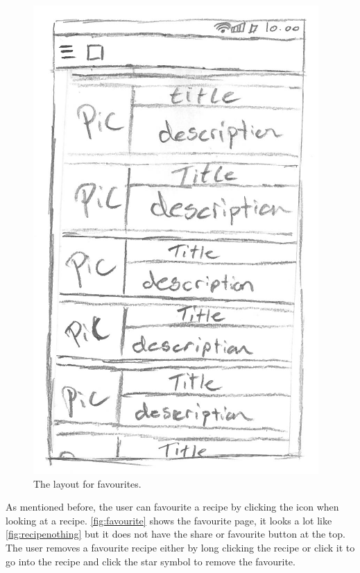 \begin{figure}[H]
\centering
\includegraphics[width=0.35\linewidth]{img/prototypes/favorites.pdf}
\caption{The layout for favourites.}
\label{fig:favourite}
\end{figure}

As mentioned before, the user can favourite a recipe by clicking the icon when looking at a recipe. \autoref{fig:favourite} shows the favourite page, it looks a lot like \autoref{fig:recipenothing} but it does not have the share or favourite button at the top. The user removes a favourite recipe either by long clicking the recipe or click it to go into the recipe and click the star symbol to remove the favourite.

